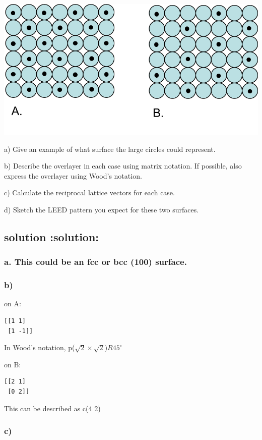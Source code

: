 \documentclass{article}
\begin{document}
\includegraphics[width=.9\linewidth]{./images/hwk2-leed.png}

a) Give an example of what surface the large circles could represent.

b) Describe the overlayer in each case using matrix notation. If possible, also express the overlayer using Wood's notation.

c) Calculate the reciprocal lattice vectors for each case.

d) Sketch the LEED pattern you expect for these two surfaces.
\subsection{solution \textbf{:solution:}}
\label{sec-2-1}
\subsubsection{a. This could be an fcc or bcc (100) surface.}
\label{sec-2-1-1}
\subsubsection{b)}
\label{sec-2-1-2}

on A: 

\begin{verbatim}
[[1 1]
 [1 -1]]
\end{verbatim}

In Wood's notation, p($\sqrt{2} \times \sqrt{2}) R 45^\circ$

on B:

\begin{verbatim}
[[2 1]
 [0 2]]
\end{verbatim}

This can be described as c(4 \texttimes{} 2)
\subsubsection{c)}
\label{sec-2-1-3}
\end{document}
